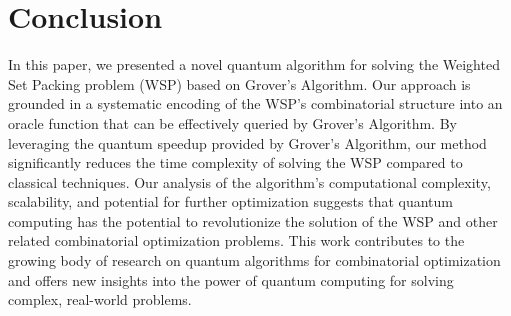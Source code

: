\section{Conclusion}\label{sec:conclusion}

In this paper, we presented a novel quantum algorithm for solving the Weighted Set Packing problem (WSP) based on Grover's Algorithm. Our approach is grounded in a systematic encoding of the WSP's combinatorial structure into an oracle function that can be effectively queried by Grover's Algorithm. By leveraging the quantum speedup provided by Grover's Algorithm, our method significantly reduces the time complexity of solving the WSP compared to classical techniques. Our analysis of the algorithm's computational complexity, scalability, and potential for further optimization suggests that quantum computing has the potential to revolutionize the solution of the WSP and other related combinatorial optimization problems. This work contributes to the growing body of research on quantum algorithms for combinatorial optimization and offers new insights into the power of quantum computing for solving complex, real-world problems.

